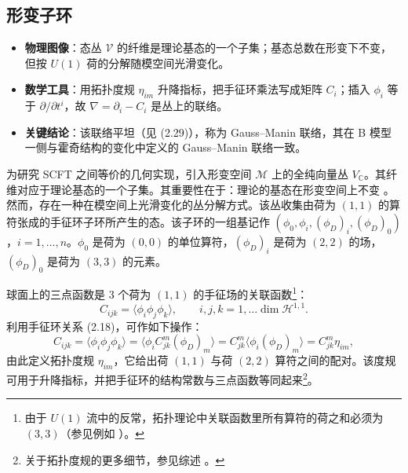 \subsection{形变子环}
\label{sec:2.4}

\begin{keytakeaways}
  \begin{itemize}[leftmargin=1.4em,itemsep=2pt,topsep=2pt]
    \item \textbf{物理图像}：态丛 $\mathcal{V}$ 的纤维是理论基态的一个子集；基态总数在形变下不变，但按 $U(1)$ 荷的分解随模空间光滑变化。
    \item \textbf{数学工具}：用拓扑度规 $\eta_{im}$ 升降指标，把手征环乘法写成矩阵 $C_{i}$；插入 $\phi_{i}$ 等于 $\partial/\partial t^{i}$，故 $\nabla=\partial_{i}-C_{i}$ 是丛上的联络。
    \item \textbf{关键结论}：该联络平坦（见 (2.29)），称为 Gauss--Manin 联络，其在 B 模型一侧与霍奇结构的变化中定义的 Gauss--Manin 联络一致。
  \end{itemize}
\end{keytakeaways}

为研究 SCFT 之间等价的几何实现，引入形变空间 $\mathcal{M}$ 上的全纯向量丛 $V_{\mathbb{C}}$。其纤维对应于理论基态的一个子集。其重要性在于：理论的基态在形变空间上不变 \cite{ref9}。然而，存在一种在模空间上光滑变化的丛分解方式。该丛收集由荷为 $(1,1)$ 的算符张成的手征环子环所产生的态。该子环的一组基记作 $(\phi_{0},\phi_{i},(\phi_{D})_{i},(\phi_{D})_{0})$，$i=1,\ldots,n$。$\phi_{0}$ 是荷为 $(0,0)$ 的单位算符，$(\phi_{D})_{i}$ 是荷为 $(2,2)$ 的场，$(\phi_{D})_{0}$ 是荷为 $(3,3)$ 的元素。

球面上的三点函数是 3 个荷为 $(1,1)$ 的手征场的关联函数\footnote{由于 $U(1)$ 流中的反常，拓扑理论中关联函数里所有算符的荷之和必须为 $(3,3)$（参见例如 \cite{ref30,ref10}）。}：
\begin{equation}\tag{2.22}
C_{ijk}=\langle\phi_{i}\phi_{j}\phi_{k}\rangle,\qquad i,j,k=1,\ldots\dim\mathcal{H}^{1,1}.
\end{equation}
利用手征环关系 (2.18)，可作如下操作：
\begin{equation}\tag{2.23}
C_{ijk}=\langle\phi_{i}\phi_{j}\phi_{k}\rangle=\langle\phi_{i}C^{m}_{jk}(\phi_{D})_{m}\rangle=C^{m}_{jk}\langle\phi_{i}(\phi_{D})_{m}\rangle=C^{m}_{jk}\eta_{im},
\end{equation}
由此定义拓扑度规 $\eta_{im}$，它给出荷 $(1,1)$ 与荷 $(2,2)$ 算符之间的配对。该度规可用于升降指标，并把手征环的结构常数与三点函数等同起来\footnote{关于拓扑度规的更多细节，参见综述 \cite{ref33}。}。

